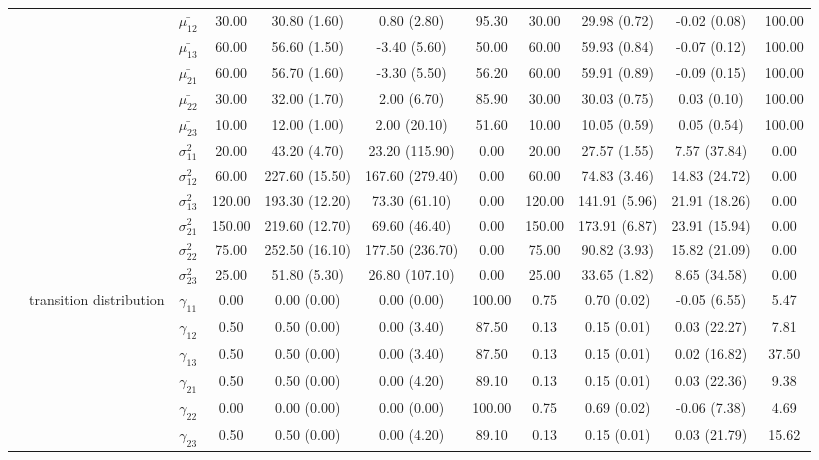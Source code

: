 \begin{table}[h]
{\begin{tabular}{ccccccccccc}
 & \multirow{11}{*}{} & $\bar{\mu_{12}}$ & 30.00 & 30.80 (1.60) & 0.80 (2.80) & 95.30 & 30.00 & 29.98 (0.72) & -0.02 (0.08) & 100.00 \\
 &  & $\bar{\mu_{13}}$ & 60.00 & 56.60 (1.50) & -3.40 (5.60) & 50.00 & 60.00 & 59.93 (0.84) & -0.07 (0.12) & 100.00 \\
 &  & $\bar{\mu_{21}}$ & 60.00 & 56.70 (1.60) & -3.30 (5.50) & 56.20 & 60.00 & 59.91 (0.89) & -0.09 (0.15) & 100.00 \\
 &  & $\bar{\mu_{22}}$ & 30.00 & 32.00 (1.70) & 2.00 (6.70) & 85.90 & 30.00 & 30.03 (0.75) & 0.03 (0.10) & 100.00 \\
 &  & $\bar{\mu_{23}}$ & 10.00 & 12.00 (1.00) & 2.00 (20.10) & 51.60 & 10.00 & 10.05 (0.59) & 0.05 (0.54) & 100.00 \\
 &  & $\sigma^2_{11}$ & 20.00 & 43.20 (4.70) & 23.20 (115.90) & 0.00 & 20.00 & 27.57 (1.55) & 7.57 (37.84) & 0.00 \\
 &  & $\sigma^2_{12}$ & 60.00 & 227.60 (15.50) & 167.60 (279.40) & 0.00 & 60.00 & 74.83 (3.46) & 14.83 (24.72) & 0.00 \\
 &  & $\sigma^2_{13}$ & 120.00 & 193.30 (12.20) & 73.30 (61.10) & 0.00 & 120.00 & 141.91 (5.96) & 21.91 (18.26) & 0.00 \\
 &  & $\sigma^2_{21}$ & 150.00 & 219.60 (12.70) & 69.60 (46.40) & 0.00 & 150.00 & 173.91 (6.87) & 23.91 (15.94) & 0.00 \\
 &  & $\sigma^2_{22}$ & 75.00 & 252.50 (16.10) & 177.50 (236.70) & 0.00 & 75.00 & 90.82 (3.93) & 15.82 (21.09) & 0.00 \\
 &  & $\sigma^2_{23}$ & 25.00 & 51.80 (5.30) & 26.80 (107.10) & 0.00 & 25.00 & 33.65 (1.82) & 8.65 (34.58) & 0.00 \\
 & transition distribution & $\gamma_{11}$ & 0.00 & 0.00 (0.00) & 0.00 (0.00) & 100.00 & 0.75 & 0.70 (0.02) & -0.05 (6.55) & 5.47 \\
 & \multirow{8}{*}{} & $\gamma_{12}$ & 0.50 & 0.50 (0.00) & 0.00 (3.40) & 87.50 & 0.13 & 0.15 (0.01) & 0.03 (22.27) & 7.81 \\
 &  & $\gamma_{13}$ & 0.50 & 0.50 (0.00) & 0.00 (3.40) & 87.50 & 0.13 & 0.15 (0.01) & 0.02 (16.82) & 37.50 \\
 &  & $\gamma_{21}$ & 0.50 & 0.50 (0.00) & 0.00 (4.20) & 89.10 & 0.13 & 0.15 (0.01) & 0.03 (22.36) & 9.38 \\
 &  & $\gamma_{22}$ & 0.00 & 0.00 (0.00) & 0.00 (0.00) & 100.00 & 0.75 & 0.69 (0.02) & -0.06 (7.38) & 4.69 \\
 &  & $\gamma_{23}$ & 0.50 & 0.50 (0.00) & 0.00 (4.20) & 89.10 & 0.13 & 0.15 (0.01) & 0.03 (21.79) & 15.62 \\

\end{tabular}}
\end{table}
